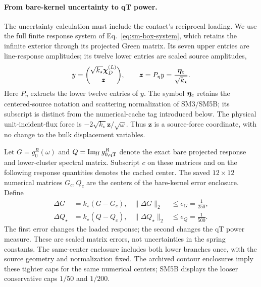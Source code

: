 \paragraph*{From bare-kernel uncertainty to qT power.}
The uncertainty calculation must include the contact's reciprocal loading. We use the full finite response system of Eq.~\eqref{eq:sm-box-system}, which retains the infinite exterior through its projected Green matrix. Its seven upper entries are line-response amplitudes; its twelve lower entries are scaled source amplitudes,
\begin{equation}
 y=\binom{\sqrt{k_\star}\bm\chi_D^{(L)}}{\bm z},
 \qquad \bm z=P_\eta y=\frac{\bm\eta_c}{\sqrt{k_\star}}.
 \label{eq:sm-ramp-scaled-state}
\end{equation}
Here $P_\eta$ extracts the lower twelve entries of $y$. The symbol $\bm\eta_c$ retains the centered-source notation and scattering normalization of SM3/SM5B; its subscript is distinct from the numerical-cache tag introduced below. The physical unit-incident-flux force is $-2\sqrt{k_\star}\bm z/\sqrt\omega$. Thus $\bm z$ is a source-force coordinate, with no change to the bulk displacement variables.

Let $G=g_0^R(\omega)$ and $Q=\operatorname{Im}_{\!H} g_{0,\mathrm{qT}}^R$ denote the exact bare projected response and lower-cluster spectral matrix. Subscript $c$ on these matrices and on the following response quantities denotes the cached center. The saved $12\times12$ numerical matrices $G_c,Q_c$ are the centers of the bare-kernel error enclosure. Define
\begin{align}
 \Delta G&=k_\star(G-G_c),&\|\Delta G\|_2&\le e_G=\frac1{250},\nonumber\\
 \Delta Q_\star&=k_\star(Q-Q_c),&\|\Delta Q_\star\|_2&\le e_Q=\frac1{500}.
 \label{eq:sm-ramp-kernel-errors}
\end{align}
The first error changes the loaded response; the second changes the qT power measure. These are scaled matrix errors, not uncertainties in the spring constants. The same-center enclosure includes both lower branches once, with the source geometry and normalization fixed. The archived contour enclosures imply these tighter caps for the same numerical centers; SM5B displays the looser conservative caps $1/50$ and $1/200$.

